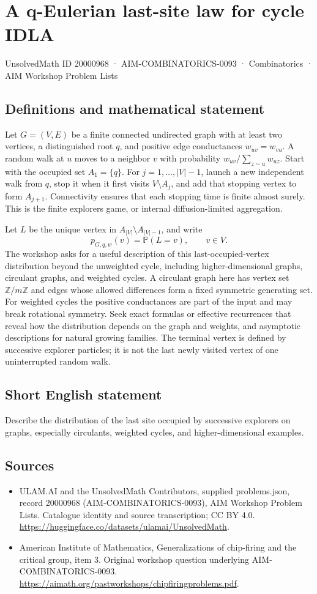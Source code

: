 \documentclass[11pt,a4paper]{article}
\begin{document}
\section*{A q-Eulerian last-site law for cycle IDLA}\label{20000968}
{\small UnsolvedMath ID 20000968 · AIM-COMBINATORICS-0093 · Combinatorics · AIM Workshop Problem Lists}
\subsection{Definitions and mathematical statement}
Let $G=(V,E)$ be a finite connected undirected graph with at least two vertices, a distinguished root $q$, and positive edge conductances $w_{uv}=w_{vu}$.
A random walk at $u$ moves to a neighbor $v$ with probability $w_{uv}/\sum_{z\sim u}w_{uz}$.
Start with the occupied set $A_1=\{q\}$.
For $j=1,\ldots,|V|-1$, launch a new independent walk from $q$, stop it when it first visits $V\setminus A_j$, and add that stopping vertex to form $A_{j+1}$.
Connectivity ensures that each stopping time is finite almost surely.
This is the finite explorers game, or internal diffusion-limited aggregation.

Let $L$ be the unique vertex in $A_{|V|}\setminus A_{|V|-1}$, and write
\[
 p_{G,q,w}(v)=\mathbb P(L=v),\qquad v\in V.
\]
The workshop asks for a useful description of this last-occupied-vertex distribution beyond the unweighted cycle, including higher-dimensional graphs, circulant graphs, and weighted cycles.
A circulant graph here has vertex set $\mathbb Z/m\mathbb Z$ and edges whose allowed differences form a fixed symmetric generating set.
For weighted cycles the positive conductances are part of the input and may break rotational symmetry.
Seek exact formulas or effective recurrences that reveal how the distribution depends on the graph and weights, and asymptotic descriptions for natural growing families.
The terminal vertex is defined by successive explorer particles; it is not the last newly visited vertex of one uninterrupted random walk.
\subsection{Short English statement}
Describe the distribution of the last site occupied by successive explorers on graphs, especially circulants, weighted cycles, and higher-dimensional examples.
\subsection{Sources}
\begin{itemize}
\item[S1] ULAM.AI and the UnsolvedMath Contributors, supplied problems.json, record 20000968 (AIM-COMBINATORICS-0093), AIM Workshop Problem Lists. Catalogue identity and source transcription; CC BY 4.0.
\url{https://huggingface.co/datasets/ulamai/UnsolvedMath}.
\item[S2] American Institute of Mathematics, Generalizations of chip-firing and the critical group, item 3. Original workshop question underlying AIM-COMBINATORICS-0093.
\url{https://aimath.org/pastworkshops/chipfiringproblems.pdf}.
\end{itemize}
\end{document}
